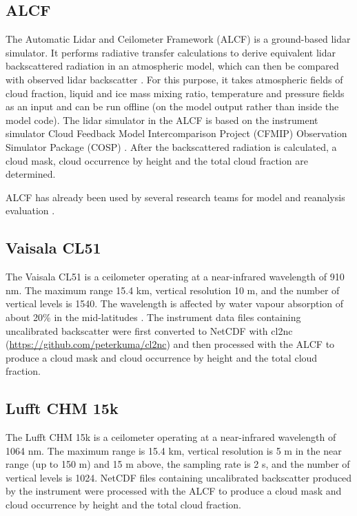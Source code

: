 \documentclass[12pt,a4paper]{article}
\begin{document}
\subsection{ALCF}

The Automatic Lidar and Ceilometer Framework (ALCF) is a ground-based lidar
simulator. It performs radiative transfer calculations to derive equivalent
lidar backscattered radiation in an atmospheric model, which can then
be compared with observed lidar backscatter \citep{kuma2021}. For this purpose,
it takes atmospheric fields of cloud fraction, liquid and ice mass mixing ratio,
temperature and pressure fields as an input and can be run offline (on the
model output rather than inside the model code). The lidar simulator in the
ALCF is based on the instrument simulator Cloud Feedback Model
Intercomparison Project (CFMIP) Observation Simulator Package (COSP)
\citep{bodas-salcedo2011}. After the backscattered radiation is calculated, a
cloud mask, cloud occurrence by height and the total cloud fraction are
determined.

ALCF has already been used by several research teams for model and reanalysis
evaluation
\citep{kuma2020,kremser2021,guyot2022,pei2023,whitehead2023,mcdonald2024}.

\subsection{Vaisala CL51}

The Vaisala CL51 is a ceilometer operating at a near-infrared wavelength of 910
nm. The maximum range 15.4 km, vertical resolution 10 m, and the number of
vertical levels is 1540. The wavelength is affected by water vapour absorption
of about 20\% in the mid-latitudes \citep{wiegner2015,wiegner2019}.  The
instrument data files containing uncalibrated backscatter were first converted
to NetCDF with cl2nc (\url{https://github.com/peterkuma/cl2nc}) and then
processed with the ALCF to produce a cloud mask and cloud occurrence by height
and the total cloud fraction.


\subsection{Lufft CHM 15k}

The Lufft CHM 15k is a ceilometer operating at a near-infrared wavelength of
1064 nm. The maximum range is 15.4 km, vertical resolution is 5 m in the near
range (up to 150 m) and 15 m above, the sampling rate is 2 s, and the number of
vertical levels is 1024.  NetCDF files containing uncalibrated backscatter
produced by the instrument were processed with the ALCF to produce a cloud mask
and cloud occurrence by height and the total cloud fraction.
\end{document}
